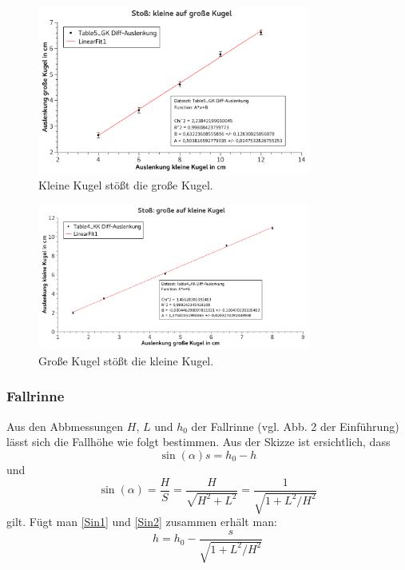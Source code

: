 \documentclass[
	a4paper,
	12pt,
	pagesize,
	ngerman
]{scrartcl}
\begin{document}
	\begin{figure}[htb]
	  \centering
	    \includegraphics[width=0.8\textwidth]{StossKKaufGK} %
	  \caption{Kleine Kugel stößt die große Kugel.}
		\label{GraphKKaufGK}
	\end{figure}
		
	\begin{figure}[htb]
	  \centering
	    \includegraphics[width=0.8\textwidth]{StossGKaufKK} %
	  \caption{Große Kugel stößt die kleine Kugel.}
		\label{GraphGKaufKK}
	\end{figure}


	\subsubsection{Fallrinne}
	Aus den Abbmessungen $H$, $L$ und $h_0$ der Fallrinne (vgl. Abb. 2 der Einführung) lässt sich die Fallhöhe wie folgt bestimmen. Aus der Skizze ist ersichtlich, dass 
	\begin{equation}
		\sin(\alpha) s = h_0-h 
		\label{Sin1}
	\end{equation}
	und
	\begin{equation}
		\sin(\alpha) = \frac{H}{S} = \frac{H}{\sqrt{H^2+L^2}} = \frac{1}{\sqrt{1+L^2/H^2}}
		\label{Sin2}
	\end{equation}
	gilt. Fügt man \cref{Sin1} und \cref{Sin2} zusammen erhält man:
	\begin{equation}
		h = h_0 - \frac{s}{\sqrt{1+ L^2/H^2}}
	\end{equation}
\end{document}
